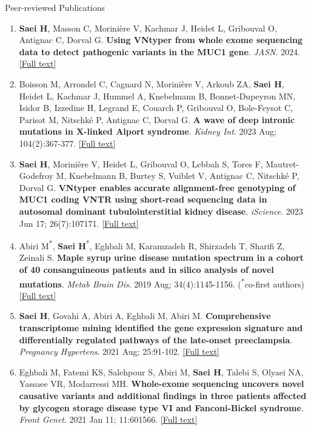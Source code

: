 \documentclass[
	11pt, %
]{resume} %
\begin{document}
\begin{rSection}{Peer-reviewed Publications}
\begin{enumerate}
  \item \textbf{Saei H}, Masson C, Morinière V, Kachmar J, Heidet L, Gribouval O, Antignac C, Dorval G. 
   \textbf{Using VNtyper from whole exome sequencing data to detect pathogenic variants in the MUC1 gene}. 
  \textit{JASN}. 2024. \href{https://journals.lww.com/jasn/fulltext/2025/02000/using_vntyper_from_whole_exome_sequencing_data_to.25.aspx}{[Full text]}

  \item Boisson M, Arrondel C, Cagnard N, Morinière V, Arkoub ZA, \textbf{Saei H}, Heidet L, Kachmar J, Hummel A,
  Knebelmann B, Bonnet-Dupeyron MN, Isidor B, Izzedine H, Legrand E, Couarch P, Gribouval O, Bole-Feysot
  C, Parisot M, Nitschké P, Antignac C, Dorval G.  \textbf{A wave of deep intronic mutations in X-linked Alport syndrome}.
  \textit{Kidney Int}. 2023 Aug; 104(2):367-377. \href{https://www.kidney-international.org/article/S0085-2538(23)00376-9/fulltext}{[Full text]}

  \item \textbf{Saei H}, Morinière V, Heidet L, Gribouval O, Lebbah S, Tores F, Mautret-Godefroy M, Knebelmann B, Burtey
  S, Vuiblet V, Antignac C, Nitschké P, Dorval G.  \textbf{VNtyper enables accurate alignment-free genotyping
  of MUC1 coding VNTR using short-read sequencing data in autosomal dominant tubulointerstitial kidney
  disease}. \textit{iScience}. 2023 Jun 17; 26(7):107171. \href{https://www.cell.com/action/showPdf?pii=S2589-0042%2823%2901248-8}{[Full text]}

  \item Abiri M\textsuperscript{*}, \textbf{Saei H}\textsuperscript{*}, Eghbali M, Karamzadeh R, Shirzadeh T, Sharifi Z, Zeinali S. 
   \textbf{Maple syrup urine disease mutation spectrum in a cohort of 40 consanguineous patients and in silico analysis of novel mutations}. 
  \textit{Metab Brain Dis}. 2019 Aug; 34(4):1145-1156. (\textsuperscript{*}co-first authors) \href{https://link.springer.com/article/10.1007/s11011-019-00435-y}{[Full text]}

  \item \textbf{Saei H}, Govahi A, Abiri A, Eghbali M, Abiri M.  \textbf{Comprehensive transcriptome mining identified the gene
  expression signature and differentially regulated pathways of the late-onset preeclampsia}. 
  \textit{Pregnancy Hypertens}. 2021 Aug; 25:91-102. \href{https://www.sciencedirect.com/science/article/abs/pii/S2210778921000386?via%3Dihub}{[Full text]}

  \item Eghbali M, Fatemi KS, Salehpour S, Abiri M, \textbf{Saei H}, Talebi S, Olyaei NA, Yassaee VR, Modarressi MH. 
   \textbf{Whole-exome sequencing uncovers novel causative variants and additional findings in three patients affected by
  glycogen storage disease type VI and Fanconi-Bickel syndrome}. 
  \textit{Front Genet}. 2021 Jan 11; 11:601566. \href{https://www.frontiersin.org/journals/genetics/articles/10.3389/fgene.2020.601566/full}{[Full text]}


\end{enumerate}
\end{rSection}
\end{document}
